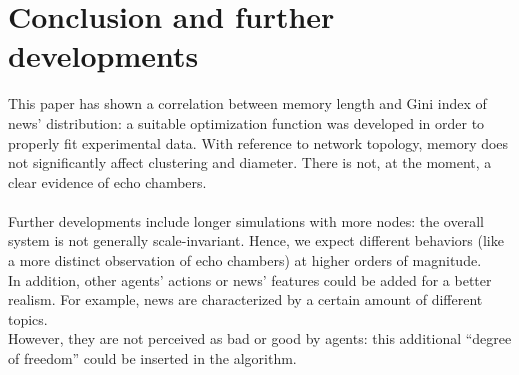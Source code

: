 \section{Conclusion and further developments}
This paper has shown a correlation between memory length and Gini
index of news' distribution: a suitable optimization function
was developed in order to properly fit experimental data.
With reference to network topology, memory does not significantly
affect clustering and diameter.
There is not, at the moment, a clear evidence of echo chambers.\\
\\
Further developments include longer simulations with more nodes:
the overall system is not generally scale-invariant.
Hence, we expect different behaviors (like a more
distinct observation
of echo chambers) at higher orders of magnitude.\\
In addition, other agents' actions or news' features could be added for a better realism.
For example, news are characterized by a certain amount of different topics.\\
However, they are not perceived as bad or good by agents: this additional ``degree of freedom''
could be inserted in the algorithm.
